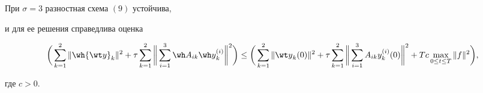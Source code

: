 \begin{thm}


При $\sigma=3$ разностная схема $(9)$ устойчива,


и для ее решения справедлива оценка


$$


\bigg(\sum_{k=1}^2\|{\wh {\wt y}}_k\|^2+\tau\sum_{k=1}^2


\bigg\|\sum_{i=1}^3 {\wh A}_{i k} {\wh y}_k^{(i)}\bigg\|^2\bigg)\le


\bigg(\sum_{k=1}^2\|{{\wt y}}_k(0)\|^2+




\tau\sum_{k=1}^2


\bigg\|\sum_{i=1}^3 {A}_{i k} {y}_k^{(i)}(0)\bigg\|^2+T c


\max_{0\le t\le T}\|f\|^2\bigg),


$$


где $c>0$.


\end{thm}





